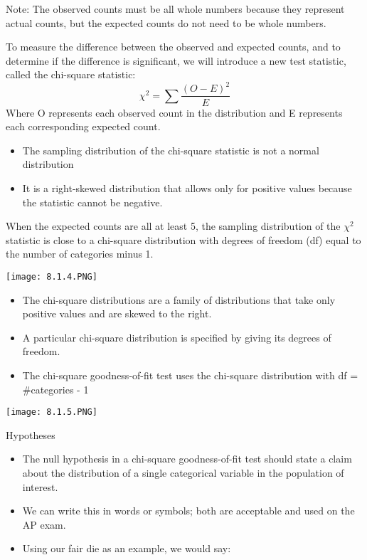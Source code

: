 \documentclass[../stats.tex]{subfiles}
\begin{document}
Note: The observed counts must be all whole numbers because they represent actual counts, but the expected counts do not need to be whole numbers.

To measure the difference between the observed and expected counts, and to determine if the difference is significant, we will introduce a new test statistic, called the chi-square statistic:
\[ \chi^2 = \sum \frac{(O-E)^2}{E} \]
Where O represents each observed count in the distribution and E represents each corresponding expected count.
\begin{itemize}
    \item The sampling distribution of the chi-square statistic is not a normal distribution 
    \item It is a right-skewed distribution that allows only for positive values because the statistic cannot be negative.
\end{itemize}

When the expected counts are all at least 5, the sampling distribution of the $\chi^2$ statistic is close to a chi-square distribution with degrees of freedom (df) equal to the number of categories minus 1.
\begin{center}
    \texttt{[image: 8.1.4.PNG]}
\end{center}
\begin{itemize}
    \item The chi-square distributions are a family of distributions that take only positive values and are skewed to the right.
    \item A particular chi-square distribution is specified by giving its degrees of freedom.
    \item The chi-square goodness-of-fit test uses the chi-square distribution with df = \#categories - 1
\end{itemize}
\begin{center}
    \texttt{[image: 8.1.5.PNG]}
\end{center}

Hypotheses 
\begin{itemize}
    \item The null hypothesis in a chi-square goodness-of-fit test should state a claim about the distribution of a single categorical variable in the population of interest.
    \item We can write this in words or symbols; both are acceptable and used on the AP exam.
    \item Using our fair die as an example, we would say:
\end{itemize}
\end{document}
